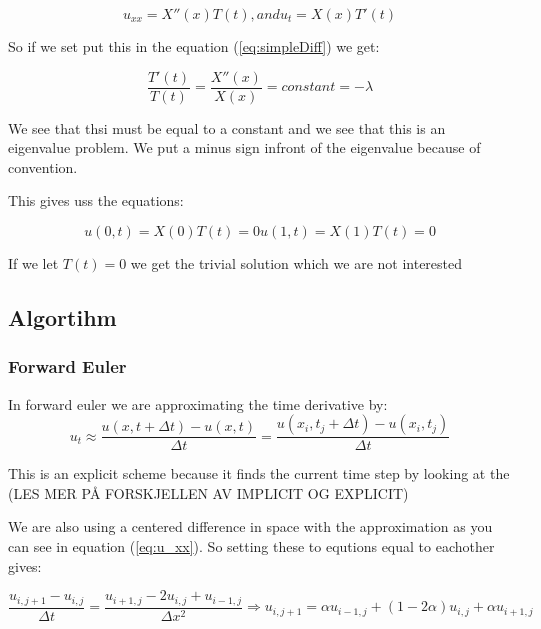 \documentclass[a4paper,10pt]{article}
\begin{document}
\begin{equation}
u_{xx} = X''(x)T(t) ,and u_t = X(x)T'(t)
\label{eq:deriv}
\end{equation}

So if we set put this in the equation (\ref{eq:simpleDiff}) we get:

\begin{equation}
\frac{T'(t)}{T(t)} = \frac{X''(x)}{X(x)} = constant = -\lambda
\label{eq:eigValue}
\end{equation}

We see that thsi must be equal to a constant and we see that this is an eigenvalue problem. We put a minus sign infront of the eigenvalue because
of convention.

This gives uss the equations:

\begin{equation}
u(0,t) = X(0)T(t) = 0 
u(1,t) = X(1)T(t) = 0
\label{eq:initialCond}
\end{equation}

If we let $T(t) = 0$ we get the trivial solution which we are not interested 



\subsection{Algortihm}
\subsubsection{Forward Euler}

In forward euler we are approximating the time derivative by:
\begin{equation}
u_t\approx \frac{u(x,t+\Delta t)-u(x,t)}{\Delta t}=\frac{u(x_i,t_j+\Delta t)-u(x_i,t_j)}{\Delta t}
\label{eq:forward_euler}
\end{equation}

This is an explicit scheme because it finds the current time step by looking at the (LES MER PÅ FORSKJELLEN AV IMPLICIT OG EXPLICIT)

We are also using a centered difference in space with the approximation as you can see in equation (\ref{eq:u_xx}). So setting these to equtions equal to eachother
 gives:
 
\begin{equation}
\frac{u_{i,j+1} - u_{i,j}}{\Delta t} = \frac{u_{i+1,j} - 2u_{i,j} + u_{i-1,j}}{\Delta x^2} \Rightarrow u_{i,j+1} = \alpha u_{i-1,j} + (1 -2\alpha)u_{i,j} + \alpha u_{i+1,j}
\label{eq:Forward_eulerScheme}
\end{equation}
\end{document}
